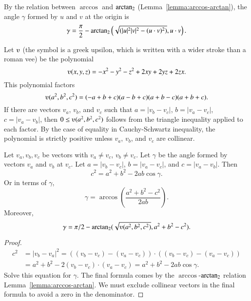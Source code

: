 By the relation between $\arccos$ and ${\operatorname{arctan_2}}$
(Lemma~\ref{lemma:arccos-arctan}), %
the angle $\gamma$ formed by $u$ and $v$ at the origin is
    \begin{equation}\label{eqn:angle}
    \gamma = \frac{\pi}2 - {\operatorname{arctan_2}}\left ({\sqrt{(|u|^2|v|^2 -
    (u\cdot v)^2)}}, {u\cdot v}\right).
    \end{equation}

Let $\ups$ (the symbol is a greek upsilon, which is written with a
wider stroke than a roman vee) be the polynomial
    $$\ups(x,y,z) = -x^2 - y^2 - z^2 + 2 x y + 2 y z + 2 z x.$$
This polynomial factors
    $$\ups(a^2,b^2,c^2) = (-a + b + c) (a - b + c) (a + b - c) (a + b +
    c).$$
If there are vectors $v_a$, $v_b$, and $v_c$ such that $a = |v_b
- v_c|$, $b = |v_a - v_c|$, $c = |v_a - v_b|$, then $0\le
\ups(a^2,b^2,c^2)$ follows from the triangle inequality applied to
each factor.  By the case of equality in Cauchy-Schwartz
inequality, the polynomial is strictly positive unless $v_a$,
$v_b$, and $v_c$ are collinear.



\begin{lemma}
Let $v_a,v_b,v_c$ be vectors with $v_a\ne v_c$, $v_b\ne v_c$.
    Let $\gamma$ be the angle formed by vectors $v_a$ and $v_b$ at $v_c$.  Let $a
    = |v_b - v_c|$, $b = |v_a - v_c|$, and $c = |v_a - v_b|$.  Then
        $$c^2 = a^2 + b^2 - 2 a b \cos\gamma.$$
Or in terms of $\gamma$,
    \begin{equation}\label{eqn:arc}
    \gamma = \arccos(\frac{a^2 + b^2 - c^2}{2 a b}).
    \end{equation}
Moreover, 
    $$\gamma=
    \pi/2 - \atn({\sqrt{\ups(a^2,b^2,c^2)}},{ a^2 + b^2 - c^2}).
    $$
\end{lemma} 

\begin{proof}
    $$\begin{array}{lll}c^2 &= |v_b - v_a|^2 = ((v_b - v_c) - (v_a - v_c))\cdot ((v_b - v_c) - (v_a -
    v_c)) \\ &= a^2 + b^2 - 2 (v_b - v_c)\cdot (v_a - v_c) = a^2 +b ^2 - 2 a b
    \cos\gamma.
    \end{array}$$
    Solve this equation for $\gamma$.  The final formula
    comes by the $\arccos$-${\operatorname{arctan_2}}$ relation Lemma~\ref{lemma:arccos-arctan}.      
   We must exclude collinear vectors in the final formula to avoid
    a zero in the denominator.
\end{proof}


